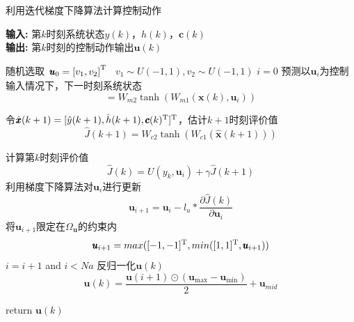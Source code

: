 \begin{algorithm}[!ht]

\caption{利用迭代梯度下降算法计算控制动作} %
\label{alg:find_optimal_policy}
\hspace*{0.02in} {\bf 输入:} %
第$k$时刻系统状态$y(k)$，$h(k)$，$\pmb c(k)$\\
\hspace*{0.02in} {\bf 输出:} %
第$k$时刻的控制动作输出${\pmb u}(k)$
\begin{algorithmic}[1]
\State 随机选取$
\begin{array}{c}{\pmb u_{0}=\left[v_{1}, v_{2}\right]^{\rm T}} \end{array}
$ \State  ${v_{1} \sim U(-1,1)} , {v_{2} \sim U(-1,1)}$ \State $i=0$
  \Do
    \State 预测以$\pmb u_i$为控制输入情况下，下一时刻系统状态
    \begin{equation}
            [\hat{y}(k+1), \hat{h}(k+1)]=W_{m 2} \tanh \left(W_{m 1}\left(\pmb x(k),\pmb u_{i}\right)\right)
    \end{equation}

    \State 令$\hat{\pmb x}(k+1)=[\hat{y}(k+1), \hat{h}(k+1),\pmb c(k)^{\rm T}]^{\rm T}$，估计$k+1$时刻评价值
    \begin{equation}
    \label{equ:estimate_J_next}
\hat{J}(k+1)=W_{c 2} \tanh \left(W_{c 1}(\hat{\pmb x}(k+1))\right)
    \end{equation}

\State 计算第$k$时刻评价值
\begin{equation}
  \label{equ:estimate_J_in_k}
    \hat{J}(k)=U\left(y_{k}, \pmb u_{i}\right)+\gamma \hat{J}(k+1)
\end{equation}
\State 利用梯度下降算法对$\pmb u_i$进行更新
\begin{equation}
\pmb u_{i+1}=\pmb u_i-l_u * \frac{\partial \hat{J}(k)}{\partial \pmb
u_{i}}
\end{equation}
\State 将$\pmb u_{i+1}$限定在$\Omega_{\pmb u}$的约束内
\begin{equation}
\pmb u_{i+1} = max([-1,-1]^{\rm T}, min([1,1]^{\rm T},\pmb u_{i+1}))
\end{equation}
\State $i=i+1$
   and $i<Na$ %
  \State 反归一化${\pmb u}(k)$
 \begin{equation}
\pmb u(k)=\frac{\pmb u(i+1) \odot\left(\pmb u_{\max }-\pmb u_{\min
}\right)}{2}+\pmb u_{mid }
\end{equation}

\State return $\pmb u(k)$

\end{algorithmic}

\end{algorithm}

